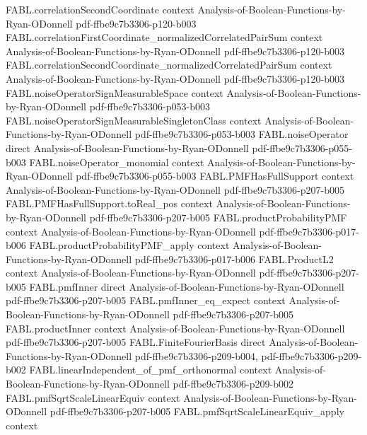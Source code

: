 \begin{theorem}
  {FABL.correlationSecondCoordinate}
  {context}
  {Analysis-of-Boolean-Functions-by-Ryan-ODonnell}
  {pdf-ffbe9c7b3306-p120-b003}
\proofstep
  {FABL.correlationFirstCoordinate_normalizedCorrelatedPairSum}
  {context}
  {Analysis-of-Boolean-Functions-by-Ryan-ODonnell}
  {pdf-ffbe9c7b3306-p120-b003}
\proofstep
  {FABL.correlationSecondCoordinate_normalizedCorrelatedPairSum}
  {context}
  {Analysis-of-Boolean-Functions-by-Ryan-ODonnell}
  {pdf-ffbe9c7b3306-p120-b003}
\proofstep
  {FABL.noiseOperatorSignMeasurableSpace}
  {context}
  {Analysis-of-Boolean-Functions-by-Ryan-ODonnell}
  {pdf-ffbe9c7b3306-p053-b003}
\proofstep
  {FABL.noiseOperatorSignMeasurableSingletonClass}
  {context}
  {Analysis-of-Boolean-Functions-by-Ryan-ODonnell}
  {pdf-ffbe9c7b3306-p053-b003}
\proofstep
  {FABL.noiseOperator}
  {direct}
  {Analysis-of-Boolean-Functions-by-Ryan-ODonnell}
  {pdf-ffbe9c7b3306-p055-b003}
\proofstep
  {FABL.noiseOperator_monomial}
  {context}
  {Analysis-of-Boolean-Functions-by-Ryan-ODonnell}
  {pdf-ffbe9c7b3306-p055-b003}
\proofstep
  {FABL.PMFHasFullSupport}
  {context}
  {Analysis-of-Boolean-Functions-by-Ryan-ODonnell}
  {pdf-ffbe9c7b3306-p207-b005}
\proofstep
  {FABL.PMFHasFullSupport.toReal_pos}
  {context}
  {Analysis-of-Boolean-Functions-by-Ryan-ODonnell}
  {pdf-ffbe9c7b3306-p207-b005}
\proofstep
  {FABL.productProbabilityPMF}
  {context}
  {Analysis-of-Boolean-Functions-by-Ryan-ODonnell}
  {pdf-ffbe9c7b3306-p017-b006}
\proofstep
  {FABL.productProbabilityPMF_apply}
  {context}
  {Analysis-of-Boolean-Functions-by-Ryan-ODonnell}
  {pdf-ffbe9c7b3306-p017-b006}
\proofstep
  {FABL.ProductL2}
  {context}
  {Analysis-of-Boolean-Functions-by-Ryan-ODonnell}
  {pdf-ffbe9c7b3306-p207-b005}
\proofstep
  {FABL.pmfInner}
  {direct}
  {Analysis-of-Boolean-Functions-by-Ryan-ODonnell}
  {pdf-ffbe9c7b3306-p207-b005}
\proofstep
  {FABL.pmfInner_eq_expect}
  {context}
  {Analysis-of-Boolean-Functions-by-Ryan-ODonnell}
  {pdf-ffbe9c7b3306-p207-b005}
\proofstep
  {FABL.productInner}
  {context}
  {Analysis-of-Boolean-Functions-by-Ryan-ODonnell}
  {pdf-ffbe9c7b3306-p207-b005}
\proofstep
  {FABL.FiniteFourierBasis}
  {direct}
  {Analysis-of-Boolean-Functions-by-Ryan-ODonnell}
  {pdf-ffbe9c7b3306-p209-b004,
    pdf-ffbe9c7b3306-p209-b002}
\proofstep
  {FABL.linearIndependent_of_pmf_orthonormal}
  {context}
  {Analysis-of-Boolean-Functions-by-Ryan-ODonnell}
  {pdf-ffbe9c7b3306-p209-b002}
\proofstep
  {FABL.pmfSqrtScaleLinearEquiv}
  {context}
  {Analysis-of-Boolean-Functions-by-Ryan-ODonnell}
  {pdf-ffbe9c7b3306-p207-b005}
\proofstep
  {FABL.pmfSqrtScaleLinearEquiv_apply}
  {context}

\end{theorem}
